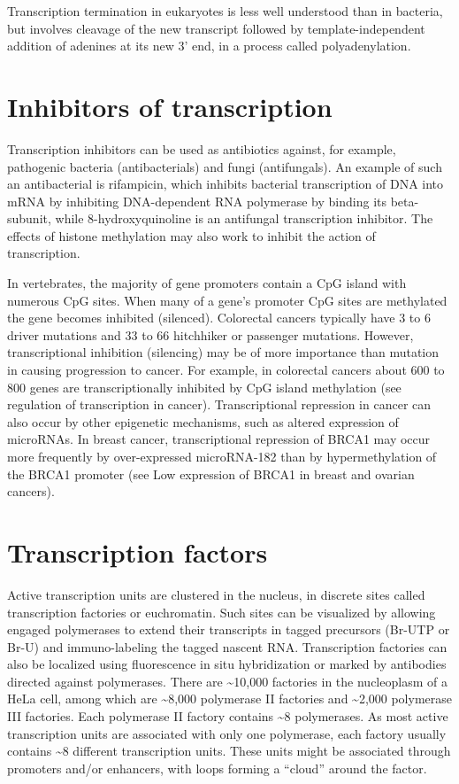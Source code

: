 Transcription termination in eukaryotes is less well understood than in bacteria, but involves cleavage of the new transcript followed by template-independent addition of adenines at its new 3' end, in a process called polyadenylation.

\hypertarget{inhibitors-of-transcription}{%
\section{Inhibitors of transcription}\label{inhibitors-of-transcription}}

Transcription inhibitors can be used as antibiotics against, for example, pathogenic bacteria (antibacterials) and fungi (antifungals). An example of such an antibacterial is rifampicin, which inhibits bacterial transcription of DNA into mRNA by inhibiting DNA-dependent RNA polymerase by binding its beta-subunit, while 8-hydroxyquinoline is an antifungal transcription inhibitor. The effects of histone methylation may also work to inhibit the action of transcription.

In vertebrates, the majority of gene promoters contain a CpG island with numerous CpG sites. When many of a gene's promoter CpG sites are methylated the gene becomes inhibited (silenced). Colorectal cancers typically have 3 to 6 driver mutations and 33 to 66 hitchhiker or passenger mutations. However, transcriptional inhibition (silencing) may be of more importance than mutation in causing progression to cancer. For example, in colorectal cancers about 600 to 800 genes are transcriptionally inhibited by CpG island methylation (see regulation of transcription in cancer). Transcriptional repression in cancer can also occur by other epigenetic mechanisms, such as altered expression of microRNAs. In breast cancer, transcriptional repression of BRCA1 may occur more frequently by over-expressed microRNA-182 than by hypermethylation of the BRCA1 promoter (see Low expression of BRCA1 in breast and ovarian cancers).

\hypertarget{transcription-factors}{%
\section{Transcription factors}\label{transcription-factors}}

Active transcription units are clustered in the nucleus, in discrete sites called transcription factories or euchromatin. Such sites can be visualized by allowing engaged polymerases to extend their transcripts in tagged precursors (Br-UTP or Br-U) and immuno-labeling the tagged nascent RNA. Transcription factories can also be localized using fluorescence in situ hybridization or marked by antibodies directed against polymerases. There are \textasciitilde{}10,000 factories in the nucleoplasm of a HeLa cell, among which are \textasciitilde{}8,000 polymerase II factories and \textasciitilde{}2,000 polymerase III factories. Each polymerase II factory contains \textasciitilde{}8 polymerases. As most active transcription units are associated with only one polymerase, each factory usually contains \textasciitilde{}8 different transcription units. These units might be associated through promoters and/or enhancers, with loops forming a ``cloud'' around the factor.

